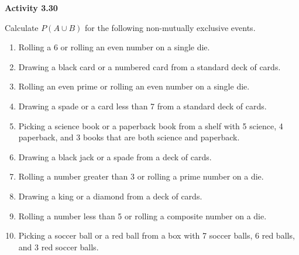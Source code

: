 \vspace{0.3ex}
\noindent\textbf{Activity 3.30}

\vspace{0.2ex}

Calculate \( P(A \cup B) \) for the following non-mutually exclusive events.

\begin{enumerate}[label=\color{blue}\arabic*.]
    \item Rolling a 6 or rolling an even number on a single die.
    \item Drawing a black card or a numbered card from a standard deck of cards.
    \item Rolling an even prime or rolling an even number on a single die.
    \item Drawing a spade or a card less than 7 from a standard deck of cards.
    \item Picking a science book or a paperback book from a shelf with 5 science, 4 paperback, and 3 books that are both science and paperback.
    \item Drawing a black jack or a spade from a deck of cards.
    \item Rolling a number greater than 3 or rolling a prime number on a die.
    \item Drawing a king or a diamond from a deck of cards.
    \item Rolling a number less than 5 or rolling a composite number on a die.
    \item Picking a soccer ball or a red ball from a box with 7 soccer balls, 6 red balls, and 3 red soccer balls.
\end{enumerate}
